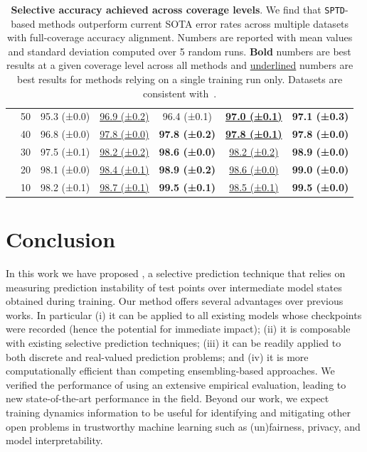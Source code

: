 \begin{table}[h!]
{\begin{tabular}{ccccccc}
     &        50 &  95.3 (±0.0) &  \underline{96.9 (±0.2)} &  96.4 (±0.1) &  \underline{\bfseries 97.0 (±0.1)} &  \bfseries 97.1 (±0.3) \\
     &        40 &  96.8 (±0.0) &  \underline{97.8 (±0.0)} &  \bfseries 97.8 (±0.2) &  \underline{\bfseries 97.8 (±0.1)} &  \bfseries 97.8 (±0.0) \\
     &        30 &  97.5 (±0.1) &  \underline{98.2 (±0.2)} &  \bfseries 98.6 (±0.0) &  \underline{98.2 (±0.2)} &  \bfseries 98.9 (±0.0) \\
     &        20 &  98.1 (±0.0) &  \underline{98.4 (±0.1)} &  \bfseries 98.9 (±0.2) &  \underline{98.6 (±0.0)} &  \bfseries 99.0 (±0.0) \\
     &        10 &  98.2 (±0.1) &  \underline{98.7 (±0.1)} &  \bfseries 99.5 (±0.1) &  \underline{98.5 (±0.1)} &  \bfseries 99.5 (±0.0) \\
\bottomrule
\end{tabular}
\caption[Selective accuracy achieved across coverage levels]{\textbf{Selective accuracy achieved across coverage levels}. We find that \texttt{SPTD}-based methods outperform current SOTA error rates across multiple datasets with full-coverage accuracy alignment. Numbers are reported with mean values and standard deviation computed over 5 random runs. \textbf{Bold} numbers are best results at a given coverage level across all methods and \underline{underlined} numbers are best results for methods relying on a single training run only. Datasets are consistent with~\cite{feng2023towards}.}
    \label{tab:target_cov}
    }
\end{table} 

\section{Conclusion}

In this work we have proposed \sptd, a selective prediction technique that relies on measuring prediction instability of test points over intermediate model states obtained during training. Our method offers several advantages over previous works. In particular (i) it can be applied to all existing models whose checkpoints were recorded (hence the potential for immediate impact); (ii) it is composable with existing selective prediction techniques; (iii) it can be readily applied to both discrete and real-valued prediction problems; and (iv) it is more computationally efficient than competing ensembling-based approaches. We verified the performance of \sptd using an extensive empirical evaluation, leading to new state-of-the-art performance in the field. Beyond our work, we expect training dynamics information to be useful for identifying and mitigating other open problems in trustworthy machine learning such as (un)fairness, privacy, and model interpretability.
